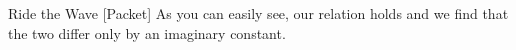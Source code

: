\begin{answer}
\begin{answerpart}{Ride the Wave [Packet]}
    As you can easily see, our relation holds and we find that the two
    differ only by an imaginary constant.

  \end{answerpart}

\end{answer}
